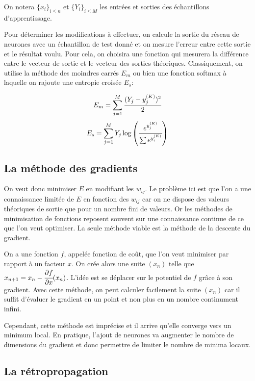 \medskip

On notera $\{x_i\}_{i \leq n}$ et $\{Y_i\}_{i \leq M}$ les entrées et sorties
des échantillons d'apprentissage.

\medskip

Pour déterminer les modifications à effectuer, on calcule la sortie du réseau de
neurones avec un échantillon de test donné et on mesure l'erreur entre cette sortie
et le résultat voulu. Pour cela,
on choisira une fonction qui mesurera la différence entre le vecteur de sortie
et le vecteur des sorties théoriques. Classiquement, on utilise la méthode des
moindres carrés $E_m$ ou bien une fonction softmax à laquelle on rajoute une
entropie croisée $E_s$:

\[E_m = \sum_{j = 1}^{M} \cfrac{(Y_j - y_j^{(K)})^2}{2}\]
\[E_s = \sum_{j = 1}^{M} Y_j \log \left(\cfrac{e^{y_j^{(K)}}}{\sum e^{y_i^{(K)}}}\right)\]

\subsection{La méthode des gradients}

On veut donc minimiser $E$ en modifiant les $w_{ij}$. Le problème ici est que
l'on a une connaissance limitée de $E$ en fonction des $w_{ij}$ car on ne
dispose des valeurs théoriques de sortie que pour un nombre fini de valeurs. Or
les méthodes de minimisation de fonctions reposent souvent sur une connaissance
continue de ce que l'on veut optimiser. La seule méthode viable est la méthode de la
descente du gradient.

\medskip

On a une fonction $f$, appelée fonction de coût, que l'on veut minimiser par
rapport à un facteur $x$. On crée alors une suite $(x_n)$ telle que
$x_{n+1} = x_{n} - \cfrac{\partial f}{\partial x}(x_n)$.
L'idée est se déplacer sur le potentiel de $f$ grâce à son gradient. Avec cette
méthode, on peut calculer facilement la suite $(x_n)$ car il suffit d'évaluer
le gradient en un point et non plus en un nombre continument infini.

\medskip

Cependant, cette méthode est imprécise et il arrive qu'elle converge vers un
minimum local. En pratique, l'ajout de neurones va augmenter le nombre de
dimensions du gradient et donc permettre de limiter le nombre de minima locaux.

\medskip

\subsection{La rétropropagation}

